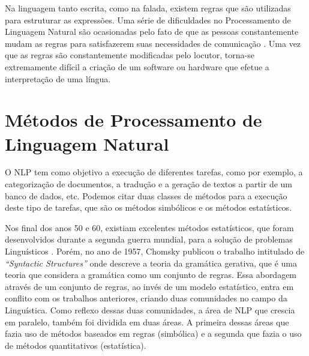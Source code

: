 Na linguagem tanto escrita, como na falada, existem regras que são utilizadas
para estruturar as expressões. Uma série de dificuldades no Processamento de
Linguagem Natural são ocasionadas pelo fato de que as pessoas constantemente
mudam as regras para satisfazerem suas necessidades de comunicação
\cite{manningschutze1999}. Uma vez que as regras são constantemente modificadas
pelo locutor, torna-se extremamente difícil a criação de um software ou hardware
que efetue a interpretação de uma língua.


%
%
%

\section{Métodos de Processamento de Linguagem Natural}

O \ac{NLP} tem como objetivo a execução de diferentes tarefas, como por exemplo,
a categorização de documentos, a tradução e a geração de textos a partir de um
banco de dados, etc. Podemos citar duas classes de métodos para a execução deste
tipo de tarefas, que são os métodos simbólicos e os métodos estatísticos.

Nos final dos anos 50 e 60, existiam excelentes métodos estatísticos, que foram
desenvolvidos durante a segunda guerra mundial, para a solução de problemas
Linguísticos \cite{shannon48}.
Porém, no ano de 1957, Chomsky publicou o trabalho intitulado de
\textit{``Syntactic Structures''} onde descreve a
teoria da gramática gerativa, que é uma teoria que considera a
gramática como um conjunto de regras. Essa abordagem através de um conjunto de
regras, ao invés de um modelo estatístico, entra em conflito com os trabalhos
anteriores, criando duas comunidades no campo da Linguística. Como reflexo
dessas duas comunidades, a área de \ac{NLP} que crescia em paralelo, também foi
dividida em duas áreas. A primeira dessas áreas que fazia uso de métodos
baseados em regras (simbólica) e a segunda que fazia o uso de métodos quantitativos (estatística).


